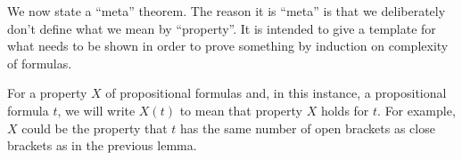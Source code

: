 \documentclass[11pt]{article}
\newcommand{\PF}{\mathrm{S}}
\newcommand{\mcal}[1]{\mathcal{#1}}
\begin{document}
%
%
%

We now state a ``meta'' theorem. The reason it is ``meta'' is that we deliberately don't define what we mean by ``property''. It is intended to give a template for what needs to be shown in order to prove something by induction on complexity of formulas.

For a property $X$ of propositional formulas and, in this instance, a propositional formula $t$, we will write $X(t)$ to mean that property $X$ holds for $t$. For example, $X$ could be the property that $t$ has the same number of open brackets as close brackets as in the previous lemma.
\end{document}
